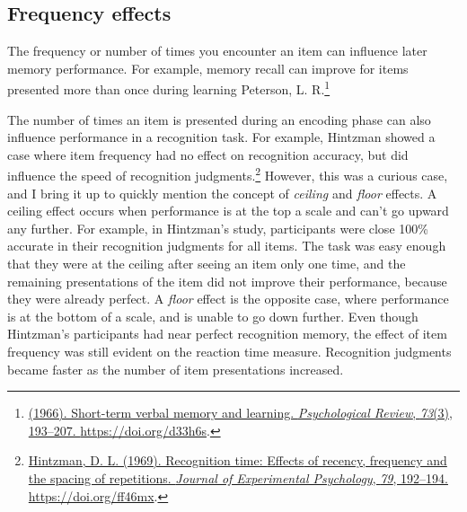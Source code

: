 \documentclass[
  oneside,
  12pt]{crumpbook}
\begin{document}
\hypertarget{frequency-effects}{%
\subsection{Frequency effects}\label{frequency-effects}}

The frequency or number of times you encounter an item can influence later memory performance. For example, memory recall can improve for items presented more than once during learning Peterson, L. R.\footnote{\protect\hyperlink{ref-petersonShorttermVerbalMemory1966}{(1966). Short-term verbal memory and learning. \emph{Psychological Review}, \emph{73}(3), 193--207. \url{https://doi.org/d33h6s}}.}

The number of times an item is presented during an encoding phase can also influence performance in a recognition task. For example, Hintzman showed a case where item frequency had no effect on recognition accuracy, but did influence the speed of recognition judgments.\footnote{\protect\hyperlink{ref-hintzmanRecognitionTimeEffects1969}{Hintzman, D. L. (1969). Recognition time: {Effects} of recency, frequency and the spacing of repetitions. \emph{Journal of Experimental Psychology}, \emph{79}, 192--194. \url{https://doi.org/ff46mx}}.} However, this was a curious case, and I bring it up to quickly mention the concept of \emph{ceiling} and \emph{floor} effects. A ceiling effect occurs when performance is at the top a scale and can't go upward any further. For example, in Hintzman's study, participants were close 100\% accurate in their recognition judgments for all items. The task was easy enough that they were at the ceiling after seeing an item only one time, and the remaining presentations of the item did not improve their performance, because they were already perfect. A \emph{floor} effect is the opposite case, where performance is at the bottom of a scale, and is unable to go down further. Even though Hintzman's participants had near perfect recognition memory, the effect of item frequency was still evident on the reaction time measure. Recognition judgments became faster as the number of item presentations increased.
\end{document}
